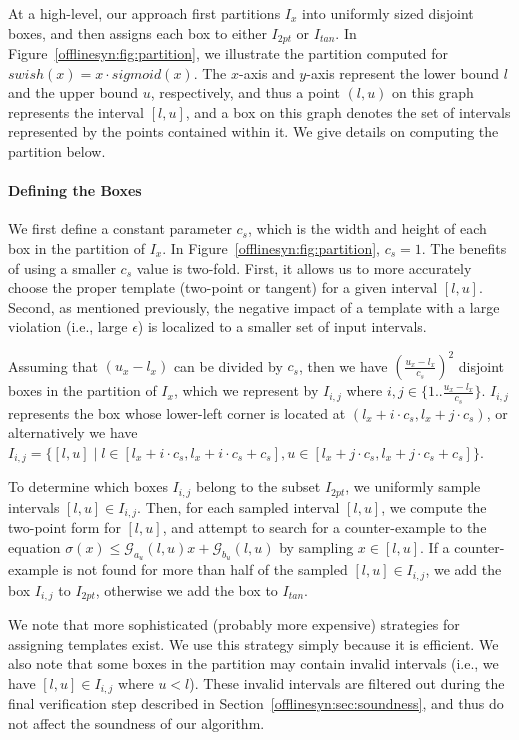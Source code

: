 At a high-level, our
approach first partitions $ I_x $ into uniformly sized disjoint boxes, and then
assigns each box to either $ I_{2pt} $ or $ I_{tan} $. In
Figure~\ref{offlinesyn:fig:partition}, we illustrate the partition computed for $
swish(x)
= x \cdot sigmoid(x) $. The $x$-axis and $y$-axis represent the lower bound $ l
$ and
the upper bound $ u $, respectively, and thus a point $ (l, u) $ on this graph
represents the interval $ [l, u] $, and a box on this graph denotes  the set
of intervals represented by the points contained within it. We give details on
computing the partition below.

\paragraph{Defining the Boxes}

We first define a constant parameter $ c_s $, which is the width and height
of each box in the partition of $ I_x $. In Figure~\ref{offlinesyn:fig:partition},
$ c_s =
1 $. The benefits of using a smaller $ c_s $ value is two-fold. First, it allows
us to more accurately choose the proper template (two-point or tangent) for a
given interval $ [l, u] $. Second, as mentioned previously, the negative impact
of a template with a large violation (i.e., large $ \epsilon $) is localized to
a smaller set of input intervals.

Assuming that $ (u_x - l_x) $ can be divided by $c_s$, then we have $
(\frac{u_x -l_x}{c_s})^2 $ disjoint boxes in the partition of $ I_x $, which we
represent by $ I_{i,j} $ where $ i,j \in \{1..\frac{u_x - l_x}{c_s}\} $.
%
$ I_{i,j} $ represents the box whose lower-left corner is located at $ (l_x + i
\cdot c_s, l_x + j \cdot c_s) $, or
%
alternatively we have $ I_{i, j} = \{ [l,u] \mid l\in [l_x + i \cdot c_s, l_x +
i \cdot c_s + c_s], u \in [l_x + j \cdot c_s, l_x + j \cdot c_s + c_s]\}$.


To determine which boxes $ I_{i,j} $ belong to the subset $ I_{2pt} $, we
uniformly sample intervals $ [l, u] \in I_{i,j} $. Then, for each sampled
interval $ [l, u] $, we compute the two-point form for $ [l, u] $, and attempt
to search for a counter-example to the equation $ \sigma(x) \leq
\mathcal{G}_{a_u}(l, u)x + \mathcal{G}_{b_u}(l, u) $ by sampling $ x
\in [l, u] $.
%
If a counter-example is not found for more than half of the
sampled $ [l, u] \in I_{i,j} $, we add the box $ I_{i, j} $ to $ I_{2pt} $,
otherwise we add the box to $ I_{tan} $.

We note that more sophisticated (probably more expensive) strategies for
assigning templates exist. We use this strategy simply because it is efficient.
We also note that some boxes in the partition may contain invalid intervals
(i.e., we have $ [l, u] \in I_{i,j} $ where $ u < l $). These invalid intervals
are filtered out during the final verification step  described in
Section~\ref{offlinesyn:sec:soundness}, and thus do not affect the soundness of our
algorithm.

